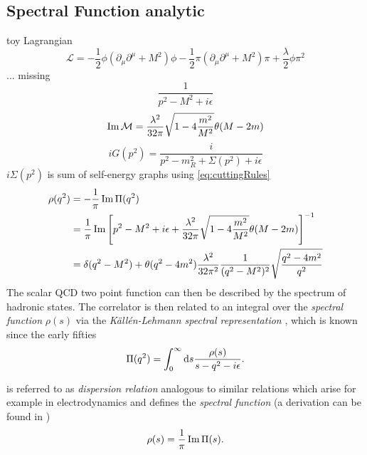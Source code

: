 \documentclass[../../index.tex]{subfiles}
\begin{document}
\subsection{Spectral Function analytic}
toy Lagrangian
\begin{equation}
  \mathcal{L} = -\frac{1}{2} \phi(\partial_\mu \partial^\mu + M^2) \phi - \frac{1}{2}\pi(\partial_\mu\partial^\mu + M^2)\pi + \frac{\lambda}{2}{\phi\pi^2}
\end{equation}
... missing
\begin{equation}
  \frac{1}{p^2-M^2+i\epsilon}
\end{equation}
\begin{equation}
    \operatorname{Im} \mathcal{M} = \frac{\lambda^2}{32 \pi} \sqrt{1 - 4\frac{m^2}{M^2}} \theta(M - 2m)
\end{equation}
\begin{equation}
  i G(p^2) = \frac{i}{p^2 - m_R^2 + \Sigma(p^2) + i\epsilon }
\end{equation}
$i \Sigma(p^2)$ is sum of self-energy graphs
using \cref{eq:cuttingRules}
\begin{equation}
  \begin{split}
    \rho(q^2) &= -\frac{1}{\pi} \operatorname{Im} \Pi(q^2) \\
    &= \frac{1}{\pi} \operatorname{Im} \left[ p^2 - M^2 + i\epsilon + \frac{\lambda^2}{32 \pi} \sqrt{1 - 4\frac{m^2}{M^2}} \theta(M - 2m) \right]^{-1} \\
    &= \delta(q^2 - M^2) + \theta(q^2 - 4m^2)\frac{\lambda^2}{32 \pi^2} \frac{1}{(q^2 - M^2)^2} \sqrt{\frac{q^2 - 4m^2}{q^2}}
  \end{split}
\end{equation}
The scalar QCD two point function can then be described by the spectrum of
hadronic states. The correlator is then related to an integral over the
\textit{spectral function} $\rho(s)$ via the \textit{Källén-Lehmann spectral
  representation} \cite{Kallen1952,Lehmann1954}, which is known since the early
fifties
\begin{equation}
  \label{eq:dispersionRelation}
  \Pi(q^2) = \int_0^\infty \dif s \frac{\rho(s)}{s - q^2 - i \epsilon}.
\end{equation}

 is referred to as \textit{dispersion relation}
analogous to similar relations which arise for example in electrodynamics and
defines the \textit{spectral function} (a derivation can be found in
\cite{Rafael1997})
\begin{equation}
  \label{eq:spectralFunction}
  \rho(s) = \frac{1}{\pi} \operatorname{Im} \Pi(s).
\end{equation}
\end{document}
